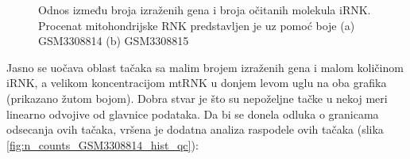 \documentclass{article}
\begin{document}
\begin{figure}[H]
    \centering
    \caption{ Odnos između broja izraženih gena i broja očitanih molekula iRNK. Procenat mitohondrijske RNK predstavljen je uz pomoć boje (a) GSM3308814 (b) GSM3308815 }
    \label{fig:odnos}
\end{figure}

Jasno se uočava oblast tačaka sa malim brojem izraženih gena i malom količinom iRNK, a velikom koncentracijom mtRNK u donjem levom uglu na oba grafika (prikazano žutom bojom). Dobra stvar je što su nepoželjne tačke u nekoj meri linearno odvojive od glavnice podataka. Da bi se donela odluka o granicama odsecanja ovih tačaka, vršena je dodatna analiza raspodele ovih tačaka (slika \ref{fig:n_counts_GSM3308814_hist_qc}):
\end{document}
